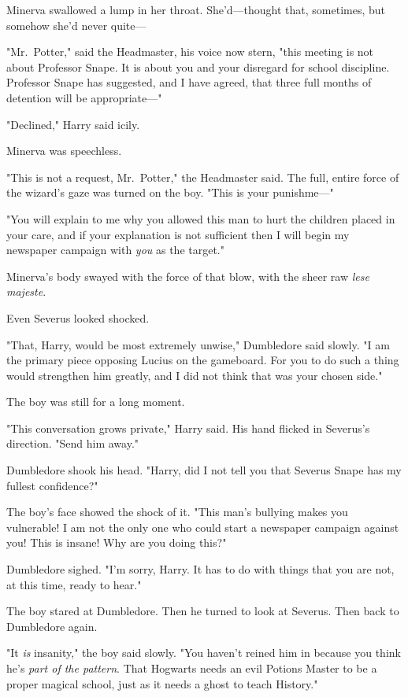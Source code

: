 Minerva swallowed a lump in her throat. She'd---thought that, sometimes, but
somehow she'd never quite---

"Mr.~Potter," said the Headmaster, his voice now stern, "this meeting is not
about Professor Snape. It is about you and your disregard for school
discipline. Professor Snape has suggested, and I have agreed, that three full
months of detention will be appropriate\mbox{---}"

"Declined," Harry said icily.

Minerva was speechless.

"This is not a request, Mr.~Potter," the Headmaster said. The full, entire
force of the wizard's gaze was turned on the boy. "This is your punishme\mbox{---}"

"You will explain to me why you allowed this man to hurt the children placed in
your care, and if your explanation is not sufficient then I will begin my
newspaper campaign with \emph{you} as the target."

Minerva's body swayed with the force of that blow, with the sheer raw
\emph{lese majeste}.

Even Severus looked shocked.

"That, Harry, would be most extremely unwise," Dumbledore said slowly. "I am
the primary piece opposing Lucius on the gameboard. For you to do such a thing
would strengthen him greatly, and I did not think that was your chosen side."

The boy was still for a long moment.

"This conversation grows private," Harry said. His hand flicked in Severus's
direction. "Send him away."

Dumbledore shook his head. "Harry, did I not tell you that Severus Snape has my
fullest confidence?"

The boy's face showed the shock of it. "This man's bullying makes you
vulnerable! I am not the only one who could start a newspaper campaign against
you! This is insane! Why are you doing this?"

Dumbledore sighed. "I'm sorry, Harry. It has to do with things that you are
not, at this time, ready to hear."

The boy stared at Dumbledore. Then he turned to look at Severus. Then back to
Dumbledore again.

"It \emph{is} insanity," the boy said slowly. "You haven't reined him in
because you think he's \emph{part of the pattern}. That Hogwarts needs an evil
Potions Master to be a proper magical school, just as it needs a ghost to teach
History."

